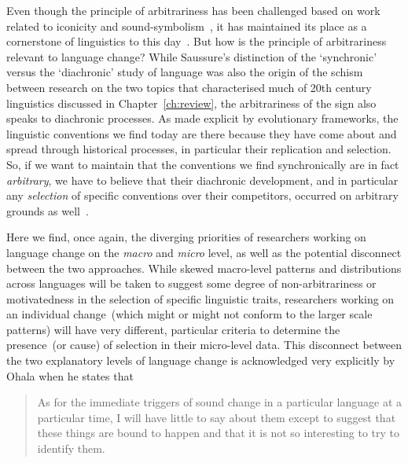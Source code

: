 Even though the principle of arbitrariness has been challenged based on work related to iconicity and sound-symbolism~\citep[see][for a review]{Perniss2010}, it has maintained its place as a cornerstone of linguistics to this day~\citep{Joseph2000}.
But how is the principle of arbitrariness relevant to language change? While Saussure's distinction of the `synchronic' versus the `diachronic' study of language was also the origin of the schism between research on the two topics that characterised much of 20th century linguistics discussed in Chapter~\ref{ch:review}, the arbitrariness of the sign also speaks to diachronic processes.
As made explicit by evolutionary frameworks, the linguistic conventions we find today are there because they have come about and spread through historical processes, in particular their replication and selection. So, if we want to maintain that the conventions we find synchronically are in fact \emph{arbitrary}, we have to believe that their diachronic development, and in particular any \emph{selection} of specific conventions over their competitors, occurred on arbitrary grounds as well~\citep[but see][p.93 for an argument why iconicity and arbitrariness are not contradictory to begin with]{Joseph2015}.

Here we find, once again, the diverging priorities of researchers working on language change on the \emph{macro} and \emph{micro} level, as well as the potential disconnect between the two approaches. While skewed macro-level patterns and distributions across languages will be taken to suggest some degree of non-arbitrariness or motivatedness in the selection of specific linguistic traits, researchers working on an individual change~(which might or might not conform to the larger scale patterns) will have very different, particular criteria to determine the presence~(or cause) of selection in their micro-level data. This disconnect between the two explanatory levels of language change is acknowledged very explicitly by Ohala when he states that

\begin{quote}
As for the immediate triggers of sound change in a particular language at a particular time, I will have little to say about them except to suggest that these things are bound to happen and that it is not so interesting to try to identify them.~\citep[p.174]{Ohala1989} %
\end{quote}

